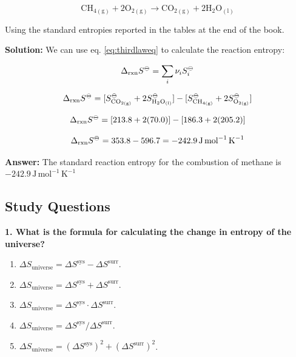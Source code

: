 \documentclass[
  9pt,
]{extbook}
\providecommand{\tightlist}{%
  \setlength{\itemsep}{0pt}\setlength{\parskip}{0pt}}
\theoremstyle{definition}
\theoremstyle{definition}
\theoremstyle{definition}
\theoremstyle{remark}
\begin{document}
\[\text{CH}_{4(\text{g})} + 2\text{O}_{2(\text{g})} \rightarrow \text{CO}_{2(\text{g})} + 2\text{H}_2\text{O}_{(\text{l})}\]

Using the standard entropies reported in the tables at the end of the book.

\textbf{Solution:} We can use eq. \eqref{eq:thirdlaweq} to calculate the reaction entropy:

\[\Delta_{\text{rxn}} S^{-\kern-6pt{\ominus}\kern-6pt-}= \sum_i \nu_i S^{-\kern-6pt{\ominus}\kern-6pt-}_i\]

\[\Delta_{\text{rxn}} S^{-\kern-6pt{\ominus}\kern-6pt-}= [S^{-\kern-6pt{\ominus}\kern-6pt-}_{\text{CO}_{2\text{(g)}}} + 2S^{-\kern-6pt{\ominus}\kern-6pt-}_{\text{H}_2\text{O}_{\text{(l)}}}] - [S^{-\kern-6pt{\ominus}\kern-6pt-}_{\text{CH}_{4 \text{(g)}}} + 2S^{-\kern-6pt{\ominus}\kern-6pt-}_{\text{O}_{2\text{(g)}}}]\]

\[\Delta_{\text{rxn}} S^{-\kern-6pt{\ominus}\kern-6pt-}= [213.8 + 2(70.0)] - [186.3 + 2(205.2)]\]

\[\Delta_{\text{rxn}} S^{-\kern-6pt{\ominus}\kern-6pt-}= 353.8 - 596.7 = -242.9\,\text{J} \, \text{mol}^{-1} \, \text{K}^{-1}\]

\textbf{Answer:} The standard reaction entropy for the combustion of methane is \(-242.9\,\text{J} \, \text{mol}^{-1} \, \text{K}^{-1}\)

\hypertarget{quest7}{%
\subsection{Study Questions}\label{quest7}}

\textbf{1. What is the formula for calculating the change in entropy of the universe?}

\begin{enumerate}
\def\labelenumi{\alph{enumi}.}
\tightlist
\item
  \(\Delta S_{\text{universe}} = \Delta S^{\text{sys}} - \Delta S^{\text{surr}}\).
\item
  \(\Delta S_{\text{universe}} = \Delta S^{\text{sys}} + \Delta S^{\text{surr}}\).
\item
  \(\Delta S_{\text{universe}} = \Delta S^{\text{sys}} \cdot \Delta S^{\text{surr}}\).
\item
  \(\Delta S_{\text{universe}} = \Delta S^{\text{sys}} / \Delta S^{\text{surr}}\).
\item
  \(\Delta S_{\text{universe}} = (\Delta S^{\text{sys}})^2 + (\Delta S^{\text{surr}})^2\).
\end{enumerate}
\end{document}
